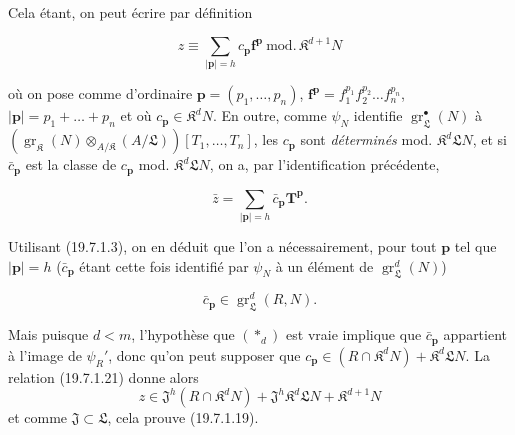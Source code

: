 Cela étant, on peut écrire par définition
\begin{env}[19.7.1.21]
\label{IV.19.7.1.21}
\[
  z\equiv\sum_{|\mathbf p|=h}c_{\mathbf p}\mathbf f^{\mathbf p}\ \mathrm{mod.}\,\mathfrak K^{d+1}N
\]
\end{env}
où on pose comme d'ordinaire $\mathbf p=(p_1,\ldots,p_n)$, $\mathbf f^{\mathbf p}=f_1^{p_1}f_2^{p_2}\ldots f_n^{p_n}$, $|\mathbf p|=p_1+\ldots+p_n$ et où $c_{\mathbf p}\in\mathfrak K^dN$. En outre, comme $\psi_N$ identifie $\operatorname{gr}_{\mathfrak L}^\bullet(N)$ à $(\operatorname{gr}_{\mathfrak K}(N)\otimes_{A/\mathfrak K}(A/\mathfrak L))[T_1,\ldots,T_n]$, les $c_{\mathbf p}$ sont \emph{déterminés} mod. $\mathfrak K^d\mathfrak LN$, et si $\bar c_{\mathbf p}$ est la classe de $c_{\mathbf p}$ mod. $\mathfrak K^d\mathfrak LN$, on a, par l'identification précédente,
\begin{env}[19.7.1.22]
\label{IV.19.7.1.22}
\[
  \bar z=\sum_{|\mathbf p|=h}\bar c_{\mathbf p}\mathbf T^{\mathbf p}.
\]
\end{env}
Utilisant (19.7.1.3), on en déduit que l'on a nécessairement, pour tout $\mathbf p$ tel que $|\mathbf p|=h$ ($\bar c_{\mathbf p}$ étant cette fois identifié par $\psi_N$ à un élément de $\operatorname{gr}_{\mathfrak L}^d(N)$)
\begin{env}[19.7.1.23]
\label{IV.19.7.1.23}
\[
  \bar c_{\mathbf p}\in\operatorname{gr}_{\mathfrak L}^d(R,N).
\]
\end{env}
Mais puisque $d<m$, l'hypothèse que $(*_d)$ est vraie implique que $\bar c_{\mathbf p}$ appartient à l'image de $\psi_R'$, donc qu'on peut supposer que $c_{\mathbf p}\in(R\cap\mathfrak K^dN)+\mathfrak K^d\mathfrak LN$. La relation (19.7.1.21) donne alors
\[
  z\in\mathfrak J^h(R\cap\mathfrak K^dN)+\mathfrak J^h\mathfrak K^d\mathfrak LN+\mathfrak K^{d+1}N
\]
et comme $\mathfrak J\subset\mathfrak L$, cela prouve (19.7.1.19).

